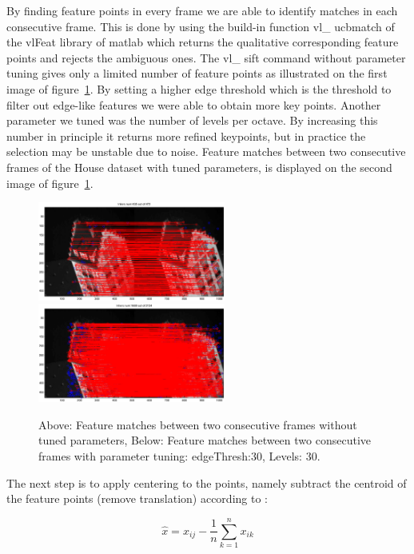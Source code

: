 By finding feature points in every frame we are able to identify matches in each consecutive frame. This is done by using the build-in function vl\_ ucbmatch of the vlFeat library of matlab which returns the qualitative corresponding feature points and rejects the ambiguous ones. The vl\_ sift command without parameter tuning gives only a limited number of feature points as illustrated on the first image of figure~\ref{fig:matches}. By setting a higher edge threshold which is the threshold to filter out edge-like features we were able to obtain more key points. Another parameter we tuned was the number of levels per octave. By increasing this number in principle it returns more refined keypoints, but in practice the selection may be unstable due to noise. Feature matches between two consecutive frames of the House dataset with tuned parameters, is displayed on the second image of figure~\ref{fig:matches}.

\begin{figure}[ht!]
  \centering
    \includegraphics[width=0.55\textwidth]{figures/matchesSimple.eps}\\
    \includegraphics[width=0.55\textwidth]{figures/matchesWithThresh.eps}
    \caption{Above: Feature matches between two consecutive frames without tuned parameters, Below: Feature matches between two consecutive frames with parameter tuning: edgeThresh:30, Levels: 30.}
    \label{fig:matches}
\end{figure}

The next step is to apply centering to the points, namely subtract the centroid of the feature points (remove translation) according to :

\begin{equation}
\hat{x} = x_{ij} - \frac{1}{n} \sum_{k=1}^{n} x_{ik}
\end{equation}

